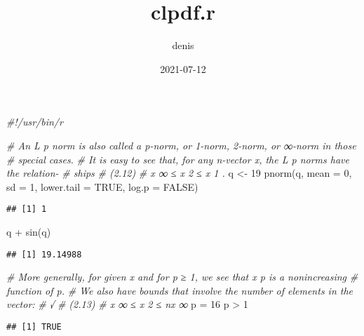 \documentclass[
]{article}
\title{clpdf.r}
\author{denis}
\date{2021-07-12}
\newenvironment{Shaded}{\begin{snugshade}}{\end{snugshade}}
\newcommand{\AttributeTok}[1]{\textcolor[rgb]{0.77,0.63,0.00}{#1}}
\newcommand{\CommentTok}[1]{\textcolor[rgb]{0.56,0.35,0.01}{\textit{#1}}}
\newcommand{\ConstantTok}[1]{\textcolor[rgb]{0.00,0.00,0.00}{#1}}
\newcommand{\DecValTok}[1]{\textcolor[rgb]{0.00,0.00,0.81}{#1}}
\newcommand{\FunctionTok}[1]{\textcolor[rgb]{0.00,0.00,0.00}{#1}}
\newcommand{\NormalTok}[1]{#1}
\newcommand{\OtherTok}[1]{\textcolor[rgb]{0.56,0.35,0.01}{#1}}
\newcommand{\SpecialCharTok}[1]{\textcolor[rgb]{0.00,0.00,0.00}{#1}}
\begin{document}
\maketitle

\begin{Shaded}
\begin{Highlighting}[]
\CommentTok{\#!/usr/bin/r}

\CommentTok{\# An L p norm is also called a p{-}norm, or 1{-}norm, 2{-}norm, or ∞{-}norm in those}
\CommentTok{\# special cases.}
\CommentTok{\# It is easy to see that, for any n{-}vector x, the L p norms have the relation{-}}
\CommentTok{\#  ships}
\CommentTok{\# (2.12)}
\CommentTok{\# x ∞ ≤ x 2 ≤ x 1 .}
\NormalTok{q }\OtherTok{\textless{}{-}} \DecValTok{19}
\FunctionTok{pnorm}\NormalTok{(q, }\AttributeTok{mean =} \DecValTok{0}\NormalTok{, }\AttributeTok{sd =} \DecValTok{1}\NormalTok{, }\AttributeTok{lower.tail =} \ConstantTok{TRUE}\NormalTok{, }\AttributeTok{log.p =} \ConstantTok{FALSE}\NormalTok{)}
\end{Highlighting}
\end{Shaded}

\begin{verbatim}
## [1] 1
\end{verbatim}

\begin{Shaded}
\begin{Highlighting}[]
\NormalTok{q }\SpecialCharTok{+} \FunctionTok{sin}\NormalTok{(q)}
\end{Highlighting}
\end{Shaded}

\begin{verbatim}
## [1] 19.14988
\end{verbatim}

\begin{Shaded}
\begin{Highlighting}[]
\CommentTok{\# More generally, for given x and for p ≥ 1, we see that x p is a nonincreasing}
\CommentTok{\# function of p.}
\CommentTok{\# We also have bounds that involve the number of elements in the vector:}
\CommentTok{\#  √}
\CommentTok{\# (2.13)}
\CommentTok{\# x ∞ ≤ x 2 ≤ nx ∞}
\NormalTok{p }\OtherTok{=} \DecValTok{16}
\NormalTok{p }\SpecialCharTok{\textgreater{}} \DecValTok{1}
\end{Highlighting}
\end{Shaded}

\begin{verbatim}
## [1] TRUE
\end{verbatim}
\end{document}

